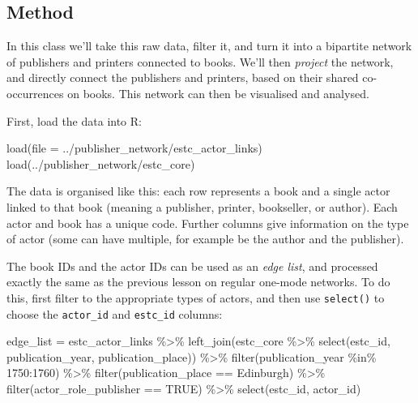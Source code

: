 \documentclass[
]{book}
\newenvironment{Shaded}{\begin{snugshade}}{\end{snugshade}}
\newcommand{\AttributeTok}[1]{\textcolor[rgb]{0.77,0.63,0.00}{#1}}
\newcommand{\ConstantTok}[1]{\textcolor[rgb]{0.00,0.00,0.00}{#1}}
\newcommand{\DecValTok}[1]{\textcolor[rgb]{0.00,0.00,0.81}{#1}}
\newcommand{\FunctionTok}[1]{\textcolor[rgb]{0.00,0.00,0.00}{#1}}
\newcommand{\NormalTok}[1]{#1}
\newcommand{\OtherTok}[1]{\textcolor[rgb]{0.56,0.35,0.01}{#1}}
\newcommand{\SpecialCharTok}[1]{\textcolor[rgb]{0.00,0.00,0.00}{#1}}
\newcommand{\StringTok}[1]{\textcolor[rgb]{0.31,0.60,0.02}{#1}}
\begin{document}
\hypertarget{method}{%
\subsection{Method}\label{method}}

In this class we'll take this raw data, filter it, and turn it into a bipartite network of publishers and printers connected to books. We'll then \emph{project} the network, and directly connect the publishers and printers, based on their shared co-occurrences on books. This network can then be visualised and analysed.

First, load the data into R:

\begin{Shaded}
\begin{Highlighting}[]
\FunctionTok{load}\NormalTok{(}\AttributeTok{file =} \StringTok{\textquotesingle{}../publisher\_network/estc\_actor\_links\textquotesingle{}}\NormalTok{)}
\FunctionTok{load}\NormalTok{(}\StringTok{\textquotesingle{}../publisher\_network/estc\_core\textquotesingle{}}\NormalTok{)}
\end{Highlighting}
\end{Shaded}

The data is organised like this: each row represents a book and a single actor linked to that book (meaning a publisher, printer, bookseller, or author). Each actor and book has a unique code. Further columns give information on the type of actor (some can have multiple, for example be the author and the publisher).

The book IDs and the actor IDs can be used as an \emph{edge list}, and processed exactly the same as the previous lesson on regular one-mode networks. To do this, first filter to the appropriate types of actors, and then use \texttt{select()} to choose the \texttt{actor\_id} and \texttt{estc\_id} columns:

\begin{Shaded}
\begin{Highlighting}[]
\NormalTok{edge\_list }\OtherTok{=}\NormalTok{ estc\_actor\_links }\SpecialCharTok{\%\textgreater{}\%} \FunctionTok{left\_join}\NormalTok{(estc\_core }\SpecialCharTok{\%\textgreater{}\%} \FunctionTok{select}\NormalTok{(estc\_id, publication\_year, publication\_place)) }\SpecialCharTok{\%\textgreater{}\%} 
  \FunctionTok{filter}\NormalTok{(publication\_year }\SpecialCharTok{\%in\%} \DecValTok{1750}\SpecialCharTok{:}\DecValTok{1760}\NormalTok{) }\SpecialCharTok{\%\textgreater{}\%} 
  \FunctionTok{filter}\NormalTok{(publication\_place }\SpecialCharTok{==} \StringTok{\textquotesingle{}Edinburgh\textquotesingle{}}\NormalTok{) }\SpecialCharTok{\%\textgreater{}\%}
  \FunctionTok{filter}\NormalTok{(actor\_role\_publisher }\SpecialCharTok{==} \ConstantTok{TRUE}\NormalTok{) }\SpecialCharTok{\%\textgreater{}\%} 
  \FunctionTok{select}\NormalTok{(estc\_id, actor\_id) }
\end{Highlighting}
\end{Shaded}
\end{document}
